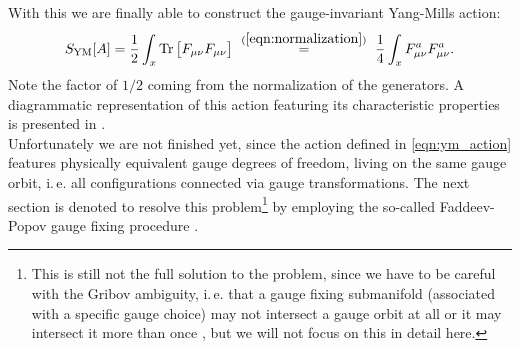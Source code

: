 With this we are finally able to construct the gauge-invariant Yang-Mills action:
\begin{equation}
	S_{\mathrm{YM}}[A] = \frac{1}{2} \int_x \operatorname{Tr}\big[F_{\mu\nu} F_{\mu\nu}\big]\ \overset{(\ref{eqn:normalization})}{=}\  \frac{1}{4} \int_x F_{\mu\nu}^{a} F_{\mu\nu}^{a}.\label{eqn:ym_action}
\end{equation}
Note the factor of $1/2$ coming from the normalization of the generators.
A diagrammatic representation of this action featuring its characteristic properties is presented  in . \\
\noindent Unfortunately we are not finished yet, since the action defined in \eqref{eqn:ym_action} features physically equivalent gauge degrees of freedom, living on the same gauge orbit, i.\,e. all configurations connected via gauge transformations. The next section is denoted to resolve this problem\footnote{This is still not the full solution to the problem, since  we have to be careful with the Gribov ambiguity, i.\,e. that  a gauge fixing submanifold (associated with a specific gauge choice) may not intersect a gauge orbit at all or it may intersect it more than once \cite{Gribov1978}, but we will not focus on this in detail here.} by employing the so-called Faddeev-Popov gauge fixing procedure \cite{FaddeevPopov1967}.
